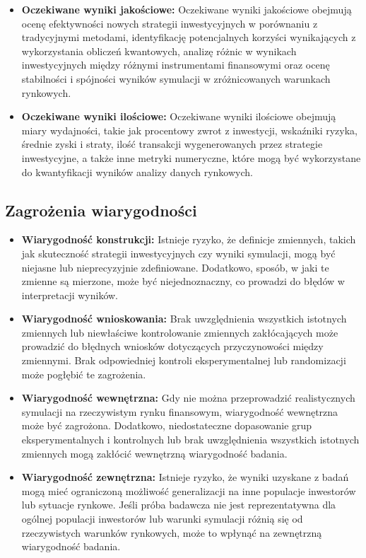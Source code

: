 \documentclass[polish,envcountsect,10pt]{article}
\begin{document}
\begin{itemize}
\item \textbf{Oczekiwane wyniki jakościowe:} Oczekiwane wyniki jakościowe obejmują ocenę efektywności nowych strategii inwestycyjnych w porównaniu z tradycyjnymi metodami, identyfikację potencjalnych korzyści wynikających z wykorzystania obliczeń kwantowych, analizę różnic w wynikach inwestycyjnych między różnymi instrumentami finansowymi oraz ocenę stabilności i spójności wyników symulacji w zróżnicowanych warunkach rynkowych.

\item \textbf{Oczekiwane wyniki ilościowe:} Oczekiwane wyniki ilościowe obejmują miary wydajności, takie jak procentowy zwrot z inwestycji, wskaźniki ryzyka, średnie zyski i straty, ilość transakcji wygenerowanych przez strategie inwestycyjne, a także inne metryki numeryczne, które mogą być wykorzystane do kwantyfikacji wyników analizy danych rynkowych.
\end{itemize}

\subsection{Zagrożenia wiarygodności}

\begin{itemize}

	\item \textbf{Wiarygodność konstrukcji:} Istnieje ryzyko, że definicje zmiennych, takich jak skuteczność strategii inwestycyjnych czy wyniki symulacji, mogą być niejasne lub nieprecyzyjnie zdefiniowane. Dodatkowo, sposób, w jaki te zmienne są mierzone, może być niejednoznaczny, co prowadzi do błędów w interpretacji wyników.

	\item \textbf{Wiarygodność wnioskowania:} Brak uwzględnienia wszystkich istotnych zmiennych lub niewłaściwe kontrolowanie zmiennych zakłócających może prowadzić do błędnych wniosków dotyczących przyczynowości między zmiennymi. Brak odpowiedniej kontroli eksperymentalnej lub randomizacji może pogłębić te zagrożenia.

	\item \textbf{Wiarygodność wewnętrzna:} Gdy nie można przeprowadzić realistycznych symulacji na rzeczywistym rynku finansowym, wiarygodność wewnętrzna może być zagrożona. Dodatkowo, niedostateczne dopasowanie grup eksperymentalnych i kontrolnych lub brak uwzględnienia wszystkich istotnych zmiennych mogą zakłócić wewnętrzną wiarygodność badania.

	\item \textbf{Wiarygodność zewnętrzna:} Istnieje ryzyko, że wyniki uzyskane z badań mogą mieć ograniczoną możliwość generalizacji na inne populacje inwestorów lub sytuacje rynkowe. Jeśli próba badawcza nie jest reprezentatywna dla ogólnej populacji inwestorów lub warunki symulacji różnią się od rzeczywistych warunków rynkowych, może to wpłynąć na zewnętrzną wiarygodność badania.
\end{itemize}
\end{document}
